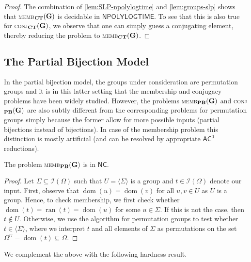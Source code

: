 \documentclass[anonymous,letter,UKenglish,cleveref,autoref,thm-restate]{lipics-v2021}
\newcommand{\sse}{\subseteq}
\newcommand{\gen}[1]{\langle #1 \rangle}
\newcommand{\dom}{\operatorname{dom}}
\newcommand{\ran}{\operatorname{ran}}
\newcommand{\NPOLYLOGTIME}{\ensuremath{\mathsf{NPOLYLOGTIME}}\xspace}
\newcommand{\ACz}{\ensuremath{\mathsf{AC}^0}\xspace}
\newcommand{\NC}{\ensuremath{\mathsf{NC}}\xspace}
\newcommand{\vG}{\ensuremath{\mathbf{G}}}
\newcommand{\ISym}{\cI}
\newcommand{\cI}{\mathcal{I}}
\theoremstyle{plain}
\theoremstyle{plain}
\newcommand{\dMemb}[2][]{\textup{\textsc{memb${}_{\mathbf{#1}}\expandafter\ifx\expandafter\relax\detokenize{#2}\relax\else(#2)\fi$}}}
\newcommand{\dConj}[2][]{\textup{\textsc{conj${}_{\mathbf{#1}}\expandafter\ifx\expandafter\relax\detokenize{#2}\relax\else(#2)\fi$}}}
\begin{document}
\begin{proof}
  The combination of \cref{lem:SLP-npolylogtime} and \cref{lem:groups-slp} shows that \dMemb[CT]{\vG} is decidable in \NPOLYLOGTIME{}.
  To see that this is also true for \dConj[CT]{\vG}, we observe that one can simply guess a conjugating element, thereby reducing the problem to \dMemb[CT]{\vG}.
\end{proof}


\subsection{The Partial Bijection Model}\label{sub:groups-pbm}

In the partial bijection model, the groups under consideration are permutation groups and it is in this latter setting that the membership and conjugacy problems have been widely studied.
However, the problems \dMemb[PB]{\vG} and \dConj[PB]{\vG} are also subtly different from the corresponding problems for permutation groups simply because the former allow for more possible inputs (partial bijections instead of bijections). 
In case of the membership problem this distinction is mostly artificial (and can be  resolved by appropriate \ACz reductions).


\begin{proposition}\label{pro:pbm-groups-membership}
  The problem \dMemb[PB]{\vG} is in \NC{}.
\end{proposition}

\begin{proof}
	Let $\Sigma \sse \ISym(\Omega)$ such that $U = \gen{\Sigma}$ is a group and $t \in \ISym(\Omega)$ denote our input.
	First, observe that $\dom(u) = \dom(v)$ for all $u,v \in U$ as $U$ is a group. 
	Hence, to check membership, we first check whether $\dom(t) = \ran(t) = \dom(u)$ for some $u \in \Sigma$. 
  If this is not the case, then $t \not\in U$. Otherwise, we use the algorithm for permutation groups \cite{BabaiLS87} to test whether $t \in\gen{\Sigma}$, where we interpret $t$ and all elements of $\Sigma$ as permutations on the set $\Omega^U = \dom(t) \sse \Omega$.
\end{proof}

We complement the above with the following hardness result.
\end{document}
